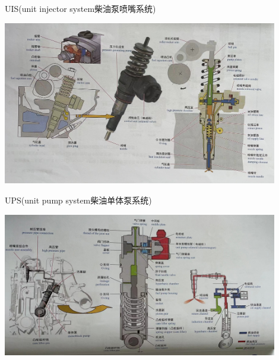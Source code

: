 \begin{frame}
	\begin{block}{UIS(unit injector system柴油泵喷嘴系统)}
		\begin{center}
			\includegraphics[width=0.9\textwidth]{2-25}
		\end{center}
	\end{block}
\end{frame}
\begin{frame}
	\begin{block}{UPS(unit pump system柴油单体泵系统)}
		\begin{center}
			\includegraphics[width=0.9\textwidth]{2-26}
		\end{center}
	\end{block}
\end{frame}
